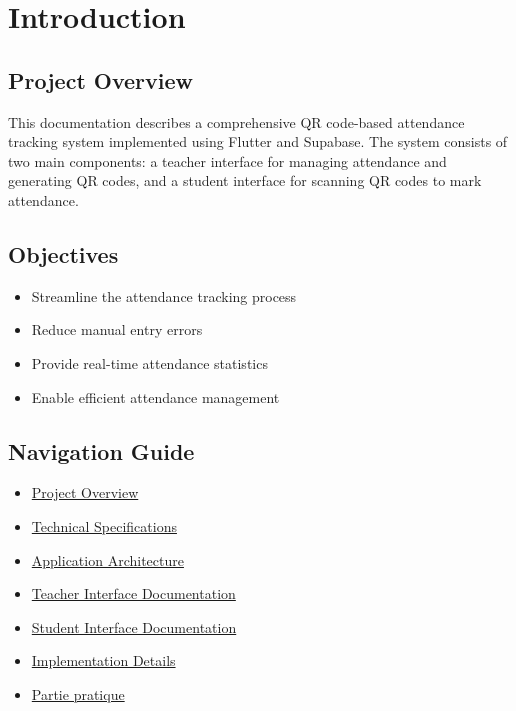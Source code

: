 \chapter{Introduction}
\section{Project Overview}
\label{sec:overview}
This documentation describes a comprehensive QR code-based attendance tracking system implemented using Flutter and Supabase. The system consists of two main components: a teacher interface for managing attendance and generating QR codes, and a student interface for scanning QR codes to mark attendance.

\section{Objectives}
\begin{itemize}
    \item Streamline the attendance tracking process
    \item Reduce manual entry errors
    \item Provide real-time attendance statistics
    \item Enable efficient attendance management
\end{itemize}

\section{Navigation Guide}
\begin{itemize}
    \item \hyperref[sec:overview]{Project Overview}
    \item \hyperref[sec:tech_specs]{Technical Specifications}
    \item \hyperref[sec:architecture]{Application Architecture}
    \item \hyperref[sec:teacher_interface]{Teacher Interface Documentation}
    \item \hyperref[sec:student_interface]{Student Interface Documentation}
    \item \hyperref[sec:implementation]{Implementation Details}
    \item \hyperref[sec:practical]{Partie pratique}
\end{itemize}